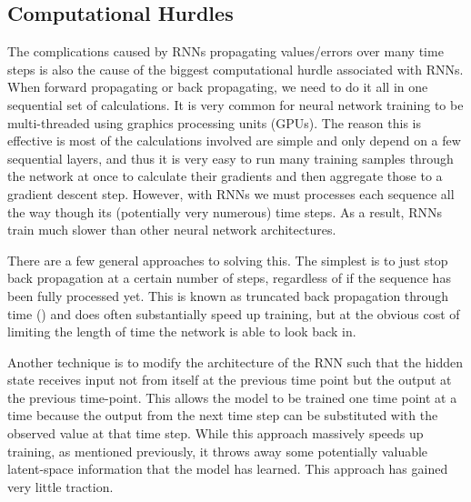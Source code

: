 \documentclass[]{book}
\theoremstyle{definition}
\theoremstyle{definition}
\theoremstyle{definition}
\theoremstyle{remark}
\begin{document}
\subsection{Computational Hurdles}\label{computational-hurdles}

The complications caused by RNNs propagating values/errors over many
time steps is also the cause of the biggest computational hurdle
associated with RNNs. When forward propagating or back propagating, we
need to do it all in one sequential set of calculations. It is very
common for neural network training to be multi-threaded using graphics
processing units (GPUs). The reason this is effective is most of the
calculations involved are simple and only depend on a few sequential
layers, and thus it is very easy to run many training samples through
the network at once to calculate their gradients and then aggregate
those to a gradient descent step. However, with RNNs we must processes
each sequence all the way though its (potentially very numerous) time
steps. As a result, RNNs train much slower than other neural network
architectures.

There are a few general approaches to solving this. The simplest is to
just stop back propagation at a certain number of steps, regardless of
if the sequence has been fully processed yet. This is known as truncated
back propagation through time (\citet{trunc_bptt}) and does often
substantially speed up training, but at the obvious cost of limiting the
length of time the network is able to look back in.

Another technique is to modify the architecture of the RNN such that the
hidden state receives input not from itself at the previous time point
but the output at the previous time-point. This allows the model to be
trained one time point at a time because the output from the next time
step can be substituted with the observed value at that time step. While
this approach massively speeds up training, as mentioned previously, it
throws away some potentially valuable latent-space information that the
model has learned. This approach has gained very little traction.
\end{document}
